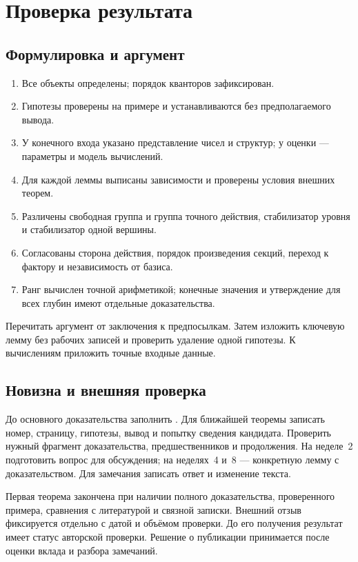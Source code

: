 \chapter{Проверка результата}

\section{Формулировка и аргумент}
\begin{enumerate}
\item Все объекты определены; порядок кванторов зафиксирован.
\item Гипотезы проверены на примере и устанавливаются без предполагаемого
      вывода.
\item У конечного входа указано представление чисел и структур;
      у оценки --- параметры и модель вычислений.
\item Для каждой леммы выписаны зависимости и проверены условия внешних теорем.
\item Различены свободная группа и группа точного действия,
      стабилизатор уровня и стабилизатор одной вершины.
\item Согласованы сторона действия, порядок произведения секций,
      переход к фактору и независимость от базиса.
\item Ранг вычислен точной арифметикой; конечные значения
      и утверждение для всех глубин имеют отдельные доказательства.
\end{enumerate}
Перечитать аргумент от заключения к предпосылкам. Затем изложить ключевую
лемму без рабочих записей и проверить удаление одной гипотезы.
К вычислениям приложить точные входные данные.

\section{Новизна и внешняя проверка}
До основного доказательства заполнить .
Для ближайшей теоремы записать номер, страницу, гипотезы, вывод
и попытку сведения кандидата. Проверить нужный фрагмент доказательства, предшественников
и продолжения. На неделе~2 подготовить вопрос для обсуждения;
на неделях~4 и~8 --- конкретную лемму с доказательством.
Для замечания записать ответ и изменение текста.

Первая теорема закончена при наличии полного доказательства,
проверенного примера, сравнения с литературой и связной записки.
Внешний отзыв фиксируется отдельно с датой и объёмом проверки.
До его получения результат имеет статус авторской проверки.
Решение о публикации принимается после оценки вклада и разбора замечаний.
